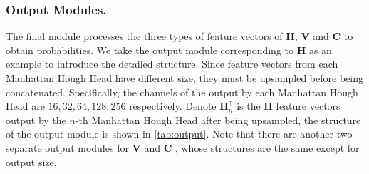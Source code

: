 \documentclass[runningheads]{llncs}
\begin{document}
\subsubsection{Output Modules.}
The final module processes the three types of feature vectors of $\mathbf{H}$, $\mathbf{V}$ and $\mathbf{C}$ to obtain probabilities. We take the output module corresponding to $\mathbf{H}$ as an example to introduce the detailed structure.
Since feature vectors from each Manhattan Hough Head have different size, they must be upsampled before being concatenated. Specifically, the channels of the output by each Manhattan Hough Head are $16, 32, 64, 128, 256$ respectively. Denote $\mathbf{H}^{\uparrow}_{n}$ is the $\mathbf{H}$ feature vectors output by the $n$-th Manhattan Hough Head after being upsampled, the structure of the output module is shown in \cref{tab:output}. Note that there are 
another two separate output modules for $\mathbf{V}$ and $\mathbf{C}$
, whose structures are the same except for output size. 
\end{document}
